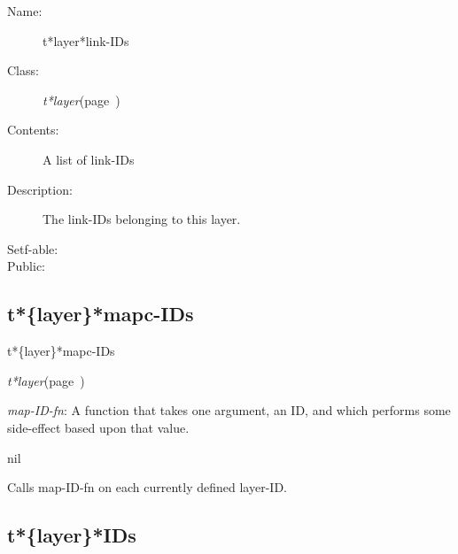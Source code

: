 \begin{description}
\item [Name:]  t*layer*link-IDs

\item [Class:] {\sl t*layer}\hfill(page~\pageref{t*layer})

\item [Contents:] 
A list of link-IDs

\item [Description:]

The link-IDs belonging to this layer.

\item [Setf-able:]


\item [Public:]



\end{description}
\horizontalline

\subsection{t*\{layer\}*mapc-IDs}
\label{t*layer*mapc-IDs}

\begin{description}
\item [Name:]  t*\{layer\}*mapc-IDs

\item [Class:] {\sl t*layer}\hfill(page~\pageref{t*layer})

\item [Parameters:]
\item {\sl map-ID-fn}:  A function that takes one argument, an ID,
and which performs some side-effect based upon that
value.



\item [Return-value:] nil

\item [Description:]

Calls map-ID-fn on each currently defined layer-ID.

\item [Public:]



\end{description}
\horizontalline

\subsection{t*\{layer\}*IDs}
\label{t*layer*IDs}

